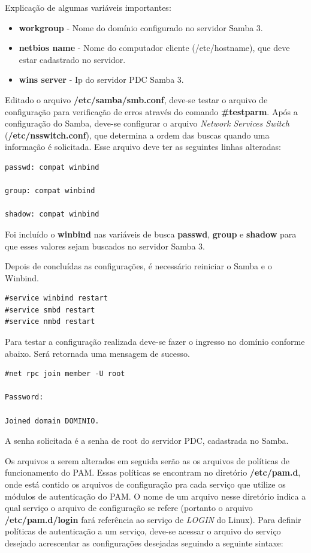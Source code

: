 Explicação de algumas variáveis importantes:
\begin{itemize}
	\item \textbf{workgroup} - Nome do domínio configurado no servidor Samba 3.
	\item \textbf{netbios name} - Nome do computador cliente (/etc/hostname), que deve estar cadastrado no servidor.
	\item \textbf{wins server} - Ip do servidor PDC Samba 3.
\end{itemize}

Editado o arquivo \textbf{/etc/samba/smb.conf}, deve-se testar o arquivo de configuração para verificação de erros através do comando \textbf{\#testparm}.
Após a configuração do Samba, deve-se configurar o arquivo \textit{Network Services Switch} (\textbf{/etc/nsswitch.conf}), que determina a ordem das buscas quando uma informação é solicitada. Esse arquivo deve ter as seguintes linhas alteradas:\\

\begin{lstlisting}	
passwd: compat winbind

group: compat winbind

shadow: compat winbind	
\end{lstlisting}

Foi incluído o \textbf{winbind} nas variáveis de busca \textbf{passwd}, \textbf{group} e \textbf{shadow} para que esses valores sejam buscados no servidor Samba 3.

Depois de concluídas as configurações, é necessário reiniciar o Samba e o Winbind.\\

\begin{lstlisting}
#service winbind restart
#service smbd restart
#service nmbd restart	
\end{lstlisting}


Para testar a configuração realizada deve-se fazer o ingresso no domínio conforme abaixo. Será retornada uma mensagem de sucesso.\\

\begin{lstlisting}	
#net rpc join member -U root

Password:

Joined domain DOMINIO.
\end{lstlisting}

A senha solicitada é a senha de root do servidor PDC, cadastrada no Samba.

Os arquivos a serem alterados em seguida serão as os arquivos de políticas de funcionamento do PAM. Essas políticas se encontram no diretório \textbf{/etc/pam.d}, onde está contido os arquivos de configuração pra cada serviço que utilize os módulos de autenticação do PAM. O nome de um arquivo nesse diretório indica a qual serviço o arquivo de configuração se refere (portanto o arquivo \textbf{/etc/pam.d/login} fará referência ao serviço de \textit{LOGIN} do Linux).
Para definir políticas de autenticação a um serviço, deve-se acessar o arquivo do serviço desejado acrescentar as configurações desejadas seguindo a seguinte sintaxe:\\

